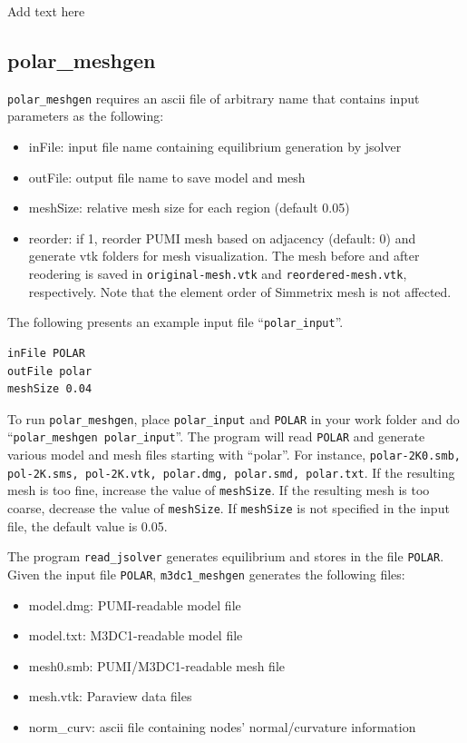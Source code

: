 Add text here

\subsection{polar\_meshgen}
\label{ch:polar-gen}
\texttt{polar\_meshgen} requires an ascii file of arbitrary name that contains input parameters as the following:
\begin{itemize}
\item inFile: input file name containing equilibrium generation by jsolver
\item outFile: output file name to save model and mesh
\item meshSize: relative mesh size for each region (default 0.05)
\item reorder: if 1, reorder PUMI mesh based on adjacency (default: 0) and generate vtk folders for mesh visualization. The mesh before and after reodering is saved in \texttt{original-mesh.vtk} and \texttt{reordered-mesh.vtk}, respectively. Note that the element order of Simmetrix mesh is not affected.
\end{itemize}

The following presents an example input file ``\texttt{polar\_input}''.
\begin{verbatim}
inFile POLAR
outFile polar
meshSize 0.04
\end{verbatim}

To run \texttt{polar\_meshgen}, place \texttt{polar\_input} and \texttt{POLAR} in your work folder and do ``\texttt{polar\_meshgen polar\_input}''. The program will read \texttt{POLAR} and generate various model and mesh files starting with ``polar''. For instance, \texttt{polar-2K0.smb, pol-2K.sms, pol-2K.vtk, polar.dmg, polar.smd, polar.txt}. If the resulting mesh is too fine, increase the value of \texttt{meshSize}. If the resulting mesh is too coarse, decrease the value of \texttt{meshSize}. If \texttt{meshSize} is not specified in the input file, the default value is 0.05.   

The program \texttt{read\_jsolver} generates equilibrium and stores in the file \texttt{POLAR}. Given the input file \texttt{POLAR}, \texttt{m3dc1\_meshgen} generates the following files:
\begin{itemize}
\item	model.dmg: PUMI-readable model file
\item	model.txt: M3DC1-readable model file
\item	mesh0.smb: PUMI/M3DC1-readable mesh file
\item	mesh.vtk: Paraview data files
\item	norm\_curv: ascii file containing nodes' normal/curvature information
\end{itemize} 


